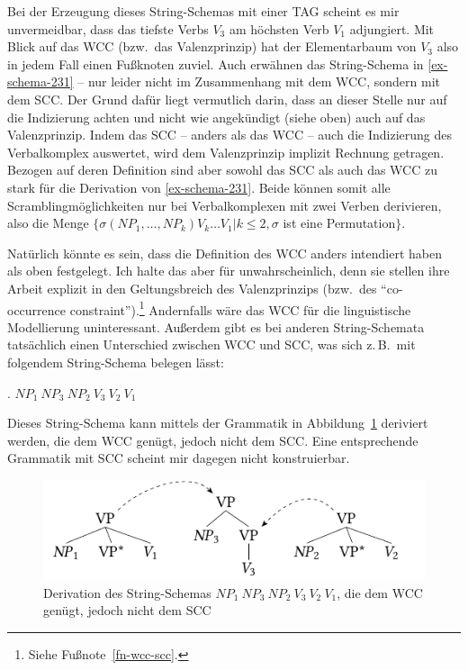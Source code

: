Bei der Erzeugung dieses String-Schemas mit einer TAG scheint es mir unvermeidbar, dass das tiefste Verbs $V_3$ am höchsten Verb $V_1$ adjungiert. Mit Blick auf das WCC (bzw.\ das Valenzprinzip) hat der Elementarbaum von $V_3$ also in jedem Fall einen Fu\ss knoten zuviel. Auch \citet[(6)]{Joshi:Becker:Rambow:00} erwähnen das String-Schema in \ref{ex-schema-231} -- nur leider nicht im Zusammenhang mit dem WCC, sondern mit dem SCC. Der Grund dafür liegt vermutlich darin, dass \cite{Joshi:Becker:Rambow:00} an dieser Stelle nur auf die Indizierung achten und nicht wie angekündigt (siehe oben) auch auf das Valenzprinzip. Indem das SCC -- anders als das WCC -- auch die Indizierung des Verbalkomplex auswertet, wird dem Valenzprinzip implizit Rechnung getragen. Bezogen auf deren Definition sind aber sowohl das SCC als auch das WCC zu stark für die Derivation von \ref{ex-schema-231}. Beide können somit alle Scramblingmöglichkeiten nur bei Verbalkomplexen mit zwei Verben derivieren, also die Menge $\{ \sigma(\mathit{NP}_1,\ldots,\mathit{NP}_k) V_k \ldots V_1 | k \leq 2, \sigma$ ist eine Permuta\-tion$\}$.

Natürlich könnte es sein, dass \cite{Joshi:Becker:Rambow:00} die Definition des WCC anders intendiert haben als oben festgelegt. Ich halte das aber für unwahrscheinlich, denn sie stellen ihre Arbeit explizit in den Geltungsbreich des Valenzprinzips (bzw.\ des "`co-occurrence constraint"').\footnote{Siehe Fu\ss note~\ref{fn-wcc-scc}.} Andernfalls wäre das WCC für die linguistische Modellierung uninteressant. Au\ss erdem gibt es bei anderen String-Schemata tatsächlich einen Unterschied zwischen WCC und SCC, was sich z.\,B.\ mit folgendem String-Schema belegen lässt:    

\ex. $\mathit{NP}_1 ~ \mathit{NP}_3 ~ \mathit{NP}_2 ~ V_3 ~ V_2 ~ V_1$\label{ex-schema-132}

Dieses String-Schema kann mittels der Grammatik in Abbildung~\ref{fig-schema-132} deriviert werden, die dem WCC genügt, jedoch nicht dem SCC. Eine entsprechende Grammatik mit SCC scheint mir dagegen nicht konstruierbar.
\begin{figure}[t]
\centering
\includegraphics{graphics/abb514.pdf}
\caption{\label{fig-schema-132}Derivation des String-Schemas $\mathit{NP}_1 ~ \mathit{NP}_3 ~ \mathit{NP}_2 ~ V_3 ~ V_2 ~ V_1$, die dem WCC genügt, jedoch nicht dem  SCC}
\end{figure}

